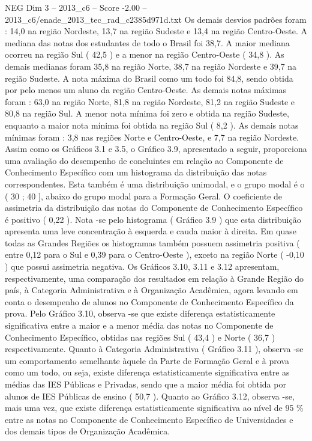 \begin{textsample}{NEG Dim 3 – 2013\_c6 – Score -2.00 – 2013\_c6/enade\_2013\_tec\_rad\_c2385d971d.txt}
Os demais desvios padrões foram : 14,0 na região Nordeste, 13,7 na região Sudeste e 13,4 na região Centro-Oeste.
A mediana das notas dos estudantes de todo o Brasil foi 38,7.
A maior mediana ocorreu na região Sul ( 42,5 ) e a menor na região Centro-Oeste ( 34,8 ).
As demais medianas foram 35,8 na região Norte, 38,7 na região Nordeste e 39,7 na região Sudeste.
A nota máxima do Brasil como um todo foi 84,8, sendo obtida por pelo menos um aluno da região Centro-Oeste.
As demais notas máximas foram : 63,0 na região Norte, 81,8 na região Nordeste, 81,2 na região Sudeste e 80,8 na região Sul.
A menor nota mínima foi zero e obtida na região Sudeste, enquanto a maior nota mínima foi obtida na região Sul ( 8,2 ).
As demais notas mínimas foram : 3,8 nas regiões Norte e Centro-Oeste, e 7,7 na região Nordeste.
Assim como os Gráficos 3.1 e 3.5, o Gráfico 3.9, apresentado a seguir, proporciona uma avaliação do desempenho de concluintes em relação ao Componente de Conhecimento Específico com um histograma da distribuição das notas correspondentes.
Esta também é uma distribuição unimodal, e o grupo modal é o ( 30 ; 40 ], abaixo do grupo modal para a Formação Geral.
O coeficiente de assimetria da distribuição das notas do Componente de Conhecimento Específico é positivo ( 0,22 ).
Nota -se pelo histograma ( Gráfico 3.9 ) que esta distribuição apresenta uma leve concentração à esquerda e cauda maior à direita.
Em quase todas as Grandes Regiões os histogramas também possuem assimetria positiva ( entre 0,12 para o Sul e 0,39 para o Centro-Oeste ), exceto na região Norte ( -0,10 ) que possui assimetria negativa.
Os Gráficos 3.10, 3.11 e 3.12 apresentam, respectivamente, uma comparação dos resultados em relação à Grande Região do país, à Categoria Administrativa e à Organização Acadêmica, agora levando em conta o desempenho de alunos no Componente de Conhecimento Específico da prova.
Pelo Gráfico 3.10, observa -se que existe diferença estatisticamente significativa entre a maior e a menor média das notas no Componente de Conhecimento Específico, obtidas nas regiões Sul ( 43,4 ) e Norte ( 36,7 ) respectivamente.
Quanto à Categoria Administrativa ( Gráfico 3.11 ), observa -se um comportamento semelhante àquele da Parte de Formação Geral e à prova como um todo, ou seja, existe diferença estatisticamente significativa entre as médias das IES Públicas e Privadas, sendo que a maior média foi obtida por alunos de IES Públicas de ensino ( 50,7 ).
Quanto ao Gráfico 3.12, observa -se, mais uma vez, que existe diferença estatisticamente significativa ao nível de 95 \% entre as notas no Componente de Conhecimento Específico de Universidades e dos demais tipos de Organização Acadêmica.

\end{textsample}
